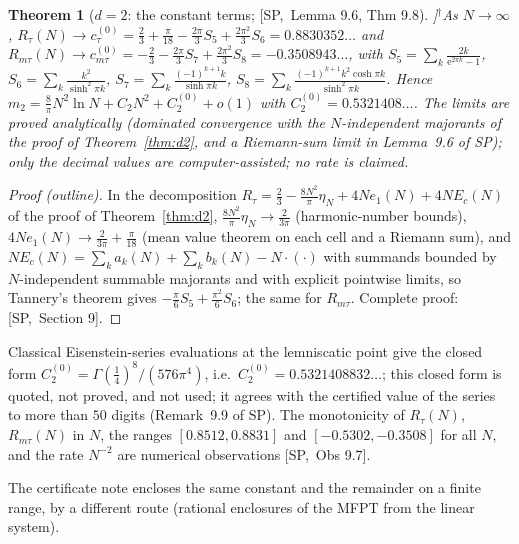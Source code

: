 \documentclass[10pt,a4paper]{article}
\theoremstyle{plain}
\newtheorem{theorem}{Theorem}[section]
\theoremstyle{definition}
\newcommand{\NEW}{\ensuremath{^{\dagger}}}       %
\newcommand{\src}[2]{[\textsf{#1},~#2]}           %
\newcommand{\SPE}{\textsf{SP}}
\newcommand{\ee}{\mathrm{e}}
\begin{document}
\begin{theorem}[$d=2$: the constant terms; \src{\SPE}{Lemma 9.6, Thm 9.8}]\NEW\label{thm:d2-constant}
As $N\to\infty$, $R_\tau(N)\to c^{(0)}_\tau=\frac23+\frac\pi{18}-\frac{2\pi}3S_5+\frac{2\pi^2}3S_6=0.8830352\ldots$ and $R_{m\tau}(N)\to c^{(0)}_{m\tau}=-\frac23-\frac{2\pi}3S_7+\frac{2\pi^2}3S_8=-0.3508943\ldots$, with $S_5=\sum_k\frac{2k}{\ee^{2\pi k}-1}$, $S_6=\sum_k\frac{k^2}{\sinh^2\pi k}$, $S_7=\sum_k\frac{(-1)^{k+1}k}{\sinh\pi k}$, $S_8=\sum_k\frac{(-1)^{k+1}k^2\cosh\pi k}{\sinh^2\pi k}$. Hence $m_2=\frac8\pi N^2\ln N+C_2N^2+C_2^{(0)}+o(1)$ with $C_2^{(0)}=0.5321408\ldots$. The limits are proved analytically (dominated convergence with the $N$-independent majorants of the proof of Theorem~\ref{thm:d2}, and a Riemann-sum limit in Lemma~9.6 of \SPE); only the decimal values are computer-assisted; no rate is claimed.
\end{theorem}
\begin{proof}[Proof (outline)]
In the decomposition $R_\tau=\frac23-\frac{8N^2}\pi\eta_N+4Ne_1(N)+4NE_c(N)$ of the proof of Theorem~\ref{thm:d2}, $\frac{8N^2}\pi\eta_N\to\frac2{3\pi}$ (harmonic-number bounds), $4Ne_1(N)\to\frac2{3\pi}+\frac\pi{18}$ (mean value theorem on each cell and a Riemann sum), and $NE_c(N)=\sum_ka_k(N)+\sum_kb_k(N)-N\cdot(\cdot)$ with summands bounded by $N$-independent summable majorants and with explicit pointwise limits, so Tannery's theorem gives $-\frac\pi6S_5+\frac{\pi^2}6S_6$; the same for $R_{m\tau}$. Complete proof: \src{\SPE}{Section 9}.
\end{proof}
Classical Eisenstein-series evaluations at the lemniscatic point give the closed form
$C_2^{(0)}=\Gamma(\frac14)^8/(576\pi^4)$, i.e.\ $C_2^{(0)}=0.5321408832\ldots$; this closed form is quoted, not proved, and not used; it agrees with the certified value of the series to more than $50$ digits (Remark~9.9 of \SPE). The monotonicity of $R_\tau(N)$, $R_{m\tau}(N)$ in $N$, the ranges $[0.8512,0.8831]$ and $[-0.5302,-0.3508]$ for all $N$, and the rate $N^{-2}$ are numerical observations \src{\SPE}{Obs 9.7}.

The certificate note encloses the same constant and the remainder on a finite range, by a different route (rational enclosures of the MFPT from the linear system).
\end{document}
